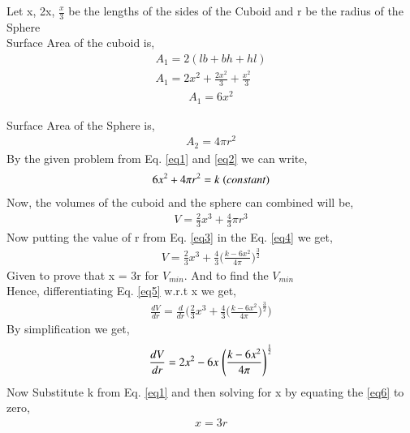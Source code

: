 \documentclass[journal,12pt,twocolumn]{IEEEtran}
\begin{document}
\vspace{0.25cm}
\raggedright
Let x, 2x, $\frac{x}{3}$ be the lengths of the sides of the Cuboid and r be the radius of the Sphere\\
\vspace{0.2cm}
Surface Area of the cuboid is,
\begin{align*}
A_1 = 2 (lb + bh + hl)\\
A_1 = 2x^2 + \frac{2x^2}{3} + \frac{x^2}{3}
\end{align*}
\begin{align}
A_1 = 6x^2
\label{eq1}
\end{align}
\raggedright
Surface Area of the Sphere is,
\begin{align}
A_2 = 4 \pi r^2
\label{eq2}
\end{align}
By the given problem from Eq. \eqref{eq1} and \eqref{eq2} we can write,
\begin{align}
6x^2 + 4 \pi r^2 = k \hspace{0.1cm}(constant)
\label{eq3}
\end{align}
Now, the volumes of the cuboid and the sphere can combined will be,
\begin{align}
V = \frac{2}{3} x^3 + \frac{4}{3} \pi r^3
\label{eq4}
\end{align}
Now putting the value of r from Eq. \eqref{eq3} in the Eq. \eqref{eq4} we get,
\begin{align}
V = \frac{2}{3} x^3 + \frac{4}{3} \Bigg( {\frac{k - 6x^2}{4 \pi}}\Bigg)^{\frac{3}{2}}
\label{eq5}
\end{align}
Given to prove that x = 3r for $V_{min}$. And to find the $V_{min}$\\
\vspace{0.25cm}
Hence, differentiating Eq. \eqref{eq5} w.r.t x we get,\\
\begin{align*}
\frac{dV}{dr} = \frac{d}{dr} \Bigg( \frac{2}{3} x^3 + \frac{4}{3} \Bigg( {\frac{k - 6x^2}{4 \pi}}\Bigg)^{\frac{3}{2}} \Bigg)
\end{align*}
By simplification we get,\\
\begin{align}
\frac{dV}{dr} = 2x^2 - 6x \hspace{0.1cm} \Bigg( {\frac{k - 6 x^2}{4 \pi}}\Bigg)^\frac{1}{2}
\label{eq6} 
\end{align}
Now Substitute k from Eq. \eqref{eq1} and then solving for x by equating the \eqref{eq6} to zero,\\
\begin{align}
x = 3r
\label{eq7}
\end{align}
\end{document}
